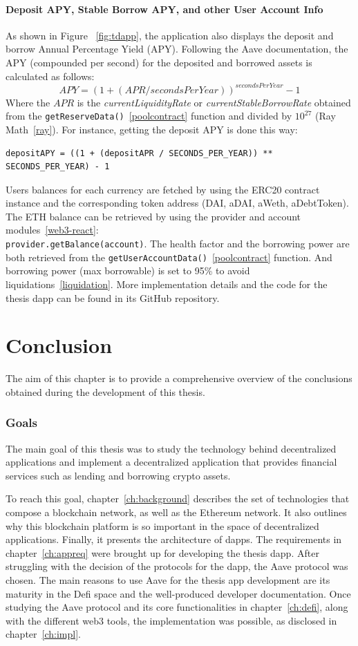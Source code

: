 \documentclass[11pt,a4paper]{report}
\begin{document}
\subsubsection{Deposit APY, Stable Borrow APY, and other User Account Info}
As shown in Figure ~\ref{fig:tdapp}, the application also displays the deposit and borrow Annual Percentage Yield (APY). Following the Aave documentation\cite{apr-apy}, the APY (compounded per second) for the deposited and borrowed assets is calculated as follows:\[ APY = (1 + ({APR}/{secondsPerYear}) )^{secondsPerYear} -1\]
Where the $APR$ is the \textit{currentLiquidityRate} or \textit{currentStableBorrowRate} obtained from the \verb|getReserveData()|~\ref{poolcontract} function and divided by $10^{27}$ (Ray Math~\ref{ray}). For instance, getting the deposit APY is done this way:
\begin{lstlisting}[frame=single]
depositAPY = ((1 + (depositAPR / SECONDS_PER_YEAR)) ** SECONDS_PER_YEAR) - 1
\end{lstlisting}
Users balances for each currency are fetched by using the ERC20 contract instance and the corresponding token address (DAI, aDAI, aWeth, aDebtToken). The ETH balance can be retrieved by using the provider and account modules~\ref{web3-react}: \\\verb|provider.getBalance(account)|. The health factor and the borrowing power are both retrieved from the \verb|getUserAccountData()|~\ref{poolcontract} function. And borrowing power (max borrowable) is set to 95\% to avoid liquidations~\ref{liquidation}. More implementation details and the code for the thesis dapp can be found in its GitHub repository\cite{thesisDappRepo}.
\chapter{Conclusion} \label{ch:conclusion}
The aim of this chapter is to provide a comprehensive overview of the conclusions obtained during the development of this thesis.

\subsection{Goals}
The main goal of this thesis was to study the technology behind decentralized applications and implement a decentralized application that provides financial services such as lending and borrowing crypto assets.

To reach this goal, chapter~\ref{ch:background} describes the set of technologies that compose a blockchain network, as well as the Ethereum network. It also outlines why this blockchain platform is so important in the space of decentralized applications. Finally, it presents the architecture of dapps. The requirements in chapter~\ref{ch:appreq} were brought up for developing the thesis dapp. After struggling with the decision of the protocols for the dapp, the Aave protocol was chosen. The main reasons to use Aave for the thesis app development are its maturity in the Defi space and the well-produced developer documentation. Once studying the Aave protocol and its core functionalities in chapter~\ref{ch:defi}, along with the different web3 tools, the implementation was possible, as disclosed in chapter~\ref{ch:impl}.
\end{document}
